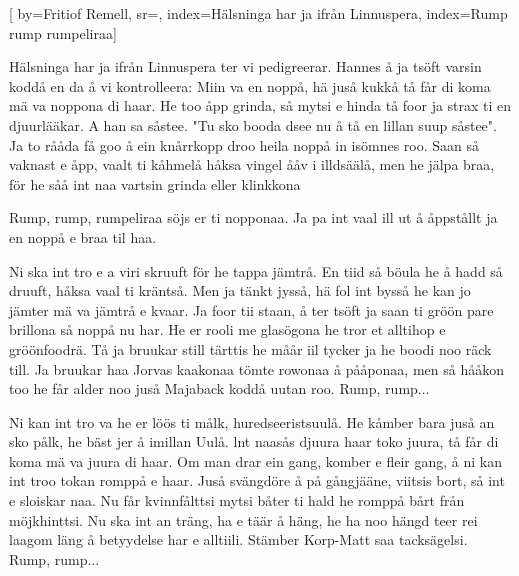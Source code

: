 

[ 		%
	by={Fritiof Remell},					%
	sr={},					%
	index={Hälsninga har ja ifrån Linnuspera}, 						%
	index={Rump rump rumpeliraa}]						%
	

\beginverse*						%
Hälsninga har ja ifrån Linnuspera
ter vi pedigreerar.
Hannes å ja tsöft varsin koddå en da
å vi kontrolleera:
Miin va en noppå, hä juså kukkå
tå får di koma mä va noppona di haar.
He too åpp grinda, så mytsi e hinda
tå foor ja strax ti en djuurlääkar.
A han sa såstee. "Tu sko booda dsee
nu å tå en lillan suup såstee".
Ja to rååda få goo å ein knårrkopp droo
heila noppå in isömnes roo.
Saan så vaknast e åpp, vaalt ti kåhmelå
håksa vingel ååv i illdsäälå,
men he jälpa braa, för he såå int naa
vartsin grinda eller klinkkona
\endverse							%

\beginchorus
Rump, rump, rumpeliraa
söjs er ti nopponaa.
Ja pa int vaal ill ut å åppstållt ja
en noppå e braa til haa.
\endchorus

\beginverse*						%
Ni ska int tro e a viri skruuft
för he tappa jämtrå.
En tiid så böula he å hadd så druuft,
håksa vaal ti kräntså.
Men ja tänkt jysså, hä fol int bysså
he kan jo jämter mä va jämtrå e kvaar.
Ja foor tii staan, å ter tsöft ja saan
ti gröön pare brillona så noppå nu har.
He er rooli me glasögona he tror et
alltihop e gröönfoodrä.
Tå ja bruukar still tärttis he måår iil
tycker ja he boodi noo räck till.
Ja bruukar haa Jorvas kaakonaa
tömte rowonaa å pååponaa,
men så hååkon too he får alder noo
juså Majaback koddå uutan roo.
Rump, rump...
\endverse							%

\beginverse*						%
Ni kan int tro va he er löös ti målk,
huredseeristsuulå.
He kåmber bara juså an sko pålk,
he bäst jer å imillan Uulå.
lnt naasås djuura haar toko juura,
tå får di koma mä va juura di haar.
Om man drar ein gang, komber e
fleir gang, å ni kan int troo tokan
romppå e haar.
Juså svängdöre å på gångjääne,
viitsis bort, så int e sloiskar naa.
Nu får kvinnfålttsi mytsi båter ti
hald he romppå bårt från möjkhinttsi.
Nu ska int an träng, ha e täär å häng,
he ha noo hängd teer rei laagom läng
å betyydelse har e alltiili. Stämber
Korp-Matt saa tacksägelsi.
Rump, rump...
\endverse							%

\endsong							%

